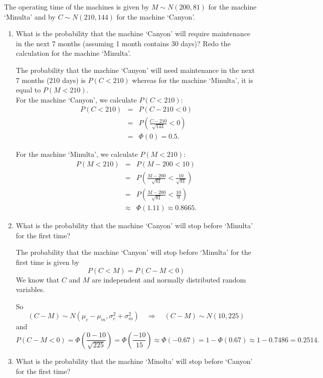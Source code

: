 \documentclass[12pt,thmsa]{article}
\begin{document}
The operating time of the machines is given by $M \sim  N(200,81)$ for the machine `Minulta' and by $ C  \sim N(210,144)$ for the machine `Canyon'.
\begin{enumerate}%
\item What is the probability that the machine `Canyon' will require maintenance in the next 7 months (assuming 1 month contains 30 days)? Redo the calculation for the machine `Minulta'.

The probability that the machine `Canyon' will need maintenance in the next 7 months (210 days) is $P (C <210)$ whereas for the machine `Minulta', it is equal to $ P ( M <210) $.\\
For the machine `Canyon', we calculate $P(C<210)$:
 \begin{eqnarray*}
P(C<210)&=& \left. P(C-210<0) \right. \nonumber  \\
&=& \left. P \left(\frac{C-210}{\sqrt{144}}<0\right) \right. \nonumber  \\
&=& \left. \Phi(0)=0.5.  \right. \nonumber
 \end{eqnarray*}
 

For the machine `Minulta', we calculate $P(M<210)$:
\begin{eqnarray*}
P(M<210)&=& \left. P(M-200<10) \right. \nonumber  \\
&=& \left. P(\frac{M-200}{\sqrt{81}}<\frac{10}{\sqrt{81}}) \right. \nonumber  \\
&=& \left.P(\frac{M-200}{\sqrt{81}}<\frac{10}{9}) \right. \nonumber  \\
&\approx & \left. \Phi(1.11) \approx 0.8665.  \right. \nonumber
 \end{eqnarray*}

\item What is the probability that the machine `Canyon' will stop before `Minulta' for the first time?

The probability that the machine `Canyon' will stop before `Minulta' for the first time is given by $$P(C<M)=P(C-M<0)$$
We know that $ C $ and $ M $ are independent and normally distributed random variables.

So $$(C-M)\sim N(\mu_c - \mu_m , \sigma_c^2 + \sigma_m^2) \quad
\Rightarrow \quad (C-M)\sim N(10, 225)$$
and
\[
P(C-M<0)=\Phi\left(\frac{0-10}{\sqrt{225}}\right)=\Phi\left(\frac{-10}{15}\right)\approx\Phi(-0.67) = 1-\Phi(0.67) \approx 1 - 0.7486 = 0.2514.
\]
\item What is the probability that the machine `Minolta' will stop before `Canyon' for the first time?


\end{enumerate}
\end{document}
